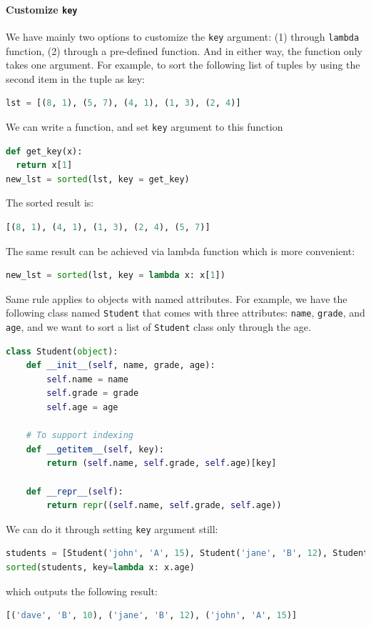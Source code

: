 \documentclass[../main.tex]{subfiles}
\begin{document}
\paragraph{Customize \texttt{key}}
We have mainly two options to customize the \texttt{key} argument: (1) through \texttt{lambda} function, (2) through a pre-defined function. And in either way, the function only takes one argument. For example, to sort the following list of tuples by using the second item in the tuple as key:
\begin{lstlisting}[language=Python]
lst = [(8, 1), (5, 7), (4, 1), (1, 3), (2, 4)]
\end{lstlisting}
We can write a function, and set \texttt{key} argument to this function
\begin{lstlisting}[language=Python]
def get_key(x):
  return x[1]
new_lst = sorted(lst, key = get_key)
\end{lstlisting}
The sorted result is:
\begin{lstlisting}[language=Python]
[(8, 1), (4, 1), (1, 3), (2, 4), (5, 7)]
\end{lstlisting}
The same result can be achieved via lambda function which is more convenient:
\begin{lstlisting}[language=Python]
new_lst = sorted(lst, key = lambda x: x[1])
\end{lstlisting}


Same rule applies to objects with named attributes. For example, we have the following class named \texttt{Student} that comes with three attributes: \texttt{name}, \texttt{grade}, and \texttt{age}, and we want to sort a list of \texttt{Student} class only through the age.
\begin{lstlisting}[language = Python]
class Student(object):
    def __init__(self, name, grade, age):
        self.name = name
        self.grade = grade
        self.age = age
    
    # To support indexing
    def __getitem__(self, key):
        return (self.name, self.grade, self.age)[key]

    def __repr__(self):
        return repr((self.name, self.grade, self.age))
\end{lstlisting}
We can do it through setting \texttt{key} argument still:
\begin{lstlisting}[language = Python]
students = [Student('john', 'A', 15), Student('jane', 'B', 12), Student('dave', 'B', 10)]
sorted(students, key=lambda x: x.age)
\end{lstlisting}
which outputs the following result:
\begin{lstlisting}[language=Python]
[('dave', 'B', 10), ('jane', 'B', 12), ('john', 'A', 15)]
\end{lstlisting}
\end{document}
